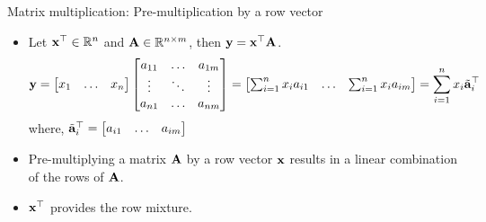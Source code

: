 \documentclass[aspectratio=169]{beamer}
\let\olditem\item
\renewcommand{\item}{\setlength{\itemsep}{\fill}\olditem}
\def\mf{\ensuremath\mathbf}
\begin{document}
\begin{frame}[t]{Matrix multiplication: Pre-multiplication by a row vector}
\begin{itemize}
\item Let $\mf{x}^{\top} \in \mathbb{R}^{n}$ and $\mf{A} \in \mathbb{R}^{n \times m}$, then $\mf{y} = \mf{x}^{\top}\mf{A}$.
\[ \mf{y} = \begin{bmatrix}
x_1 & \ldots & x_n
\end{bmatrix} \begin{bmatrix}
a_{11} & \ldots & a_{1m} \\
\vdots & \ddots & \vdots \\
a_{n1} & \ldots & a_{nm} \\
\end{bmatrix} = \begin{bmatrix} \sum_{i=1}^{n} x_i a_{i1} & \ldots & \sum_{i=1}^{n} x_i a_{im}
\end{bmatrix} = \sum_{i=1}^n x_i \tilde{\mf{a}}_i^\top \]
where, $\tilde{\mf{a}}_i^\top = \begin{bmatrix}
a_{i1} & \ldots & a_{im}\end{bmatrix}$
\item Pre-multiplying a matrix $\mf{A}$ by a row vector $\mf{x}$ results in a linear combination of the rows of $\mf{A}$.

\item $\mf{x}^\top$ provides the row mixture.
\end{itemize}
\end{frame}
\end{document}
